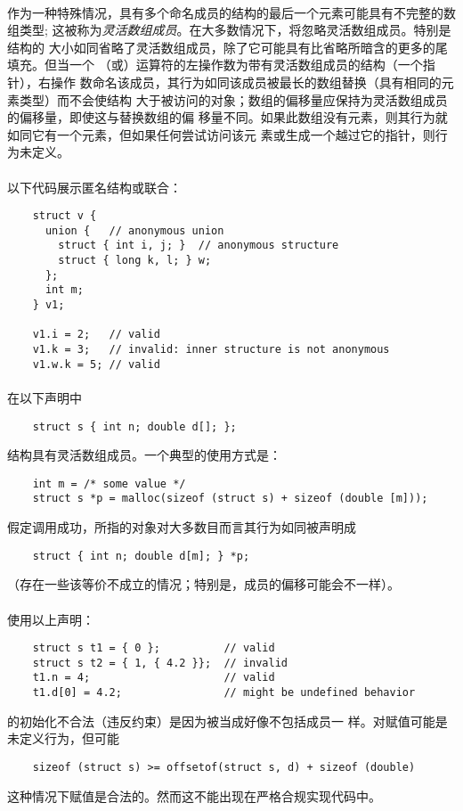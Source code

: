 {\paragraph{}
作为一种特殊情况，具有多个命名成员的结构的最后一个元素可能具有不完整的数组类型;
这被称为\textit{灵活数组成员}。在大多数情况下，将忽略灵活数组成员。特别是结构的
大小如同省略了灵活数组成员，除了它可能具有比省略所暗含的更多的尾填充。但当一个
（或\tm{->}）运算符的左操作数为带有灵活数组成员的结构（一个指针），右操作
数命名该成员，其行为如同该成员被最长的数组替换（具有相同的元素类型）而不会使结构
大于被访问的对象；数组的偏移量应保持为灵活数组成员的偏移量，即使这与替换数组的偏
移量不同。如果此数组没有元素，则其行为就如同它有一个元素，但如果任何尝试访问该元
素或生成一个越过它的指针，则行为未定义。

\paragraph{}
\ex 以下代码展示匿名结构或联合：
\begin{lstlisting}
    struct v {
      union {   // anonymous union
        struct { int i, j; }  // anonymous structure
        struct { long k, l; } w;
      };
      int m;
    } v1;

    v1.i = 2;   // valid
    v1.k = 3;   // invalid: inner structure is not anonymous
    v1.w.k = 5; // valid
\end{lstlisting}

\paragraph{}
\ex 在以下声明中
\begin{lstlisting}
    struct s { int n; double d[]; };
\end{lstlisting}
结构具有灵活数组成员。一个典型的使用方式是：
\begin{lstlisting}
    int m = /* some value */
    struct s *p = malloc(sizeof (struct s) + sizeof (double [m]));
\end{lstlisting}
假定调用成功，所指的对象对大多数目而言其行为如同被声明成
\begin{lstlisting}
    struct { int n; double d[m]; } *p;
\end{lstlisting}
（存在一些该等价不成立的情况；特别是，成员的偏移可能会不一样）。

\paragraph{}
使用以上声明：
\begin{lstlisting}
    struct s t1 = { 0 };          // valid
    struct s t2 = { 1, { 4.2 }};  // invalid
    t1.n = 4;                     // valid
    t1.d[0] = 4.2;                // might be undefined behavior
\end{lstlisting}
的初始化不合法（违反约束）是因为被当成好像不包括成员一
样。对赋值可能是未定义行为，但可能
\begin{lstlisting}
    sizeof (struct s) >= offsetof(struct s, d) + sizeof (double)
\end{lstlisting}
这种情况下赋值是合法的。然而这不能出现在严格合规实现代码中。

}
